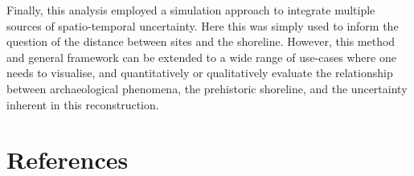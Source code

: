 \documentclass[
]{article}
\begin{document}
Finally, this analysis employed a simulation approach to integrate multiple sources of spatio-temporal uncertainty. Here this was simply used to inform the question of the distance between sites and the shoreline. However, this method and general framework can be extended to a wide range of use-cases where one needs to visualise, and quantitatively or qualitatively evaluate the relationship between archaeological phenomena, the prehistoric shoreline, and the uncertainty inherent in this reconstruction.

\newpage

\hypertarget{references}{%
\section{References}\label{references}}
\end{document}
